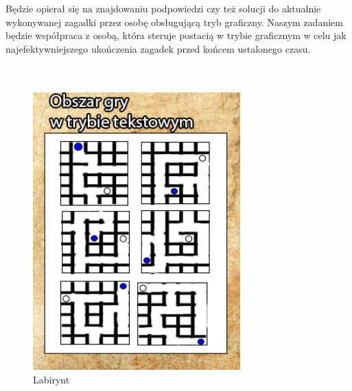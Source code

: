 Będzie opierał się na znajdowaniu podpowiedzi czy też solucji do aktualnie wykonywanej zagadki przez osobę obsługującą tryb graficzny.
Naszym zadaniem będzie współpraca z osobą, która steruje postacią w trybie graficznym w celu jak najefektywniejszego ukończenia zagadek przed końcem ustalonego czasu.
\\
\\
\\
\begin{figure}[!htb]
	\begin{center}
		\includegraphics[width=8cm]{rys/gra3.png}
		\caption{Labirynt}
		\label{rys:rysunek001}
	\end{center}
\end{figure}


